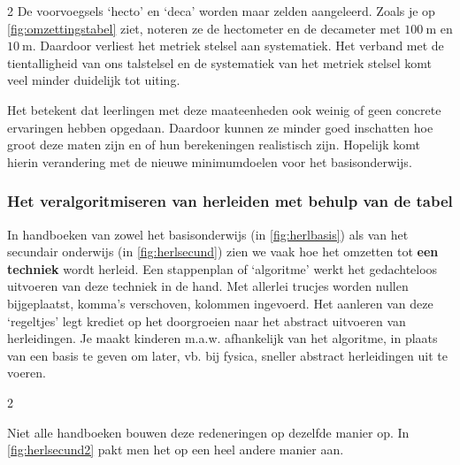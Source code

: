 \begin{multicols}{2}
De voorvoegsels `hecto' en `deca' worden maar zelden aangeleerd.
Zoals je op \autoref{fig:omzettingstabel} ziet, noteren ze de hectometer en de decameter met \(\SI{100}{\metre}\) en \(\SI{10}{\metre}\).
Daardoor verliest het metriek stelsel aan systematiek.
Het verband met de tientalligheid van ons talstelsel en de systematiek van het metriek stelsel komt veel minder duidelijk tot uiting.

Het betekent dat leerlingen met deze maateenheden ook weinig of geen concrete ervaringen hebben opgedaan.
Daardoor kunnen ze minder goed inschatten hoe groot deze maten zijn en of hun berekeningen realistisch zijn.
Hopelijk komt hierin verandering met de nieuwe minimumdoelen voor het basisonderwijs.

\subsubsection*{Het veralgoritmiseren van herleiden met behulp van de tabel}\label{het-veralgoritmiseren-van-herleiden-met-behulp-van-de-tabel}

In handboeken van zowel het basisonderwijs (in \autoref{fig:herlbasis}) als van het secundair onderwijs (in \autoref{fig:herlsecund}) zien we vaak hoe het omzetten tot \textbf{een techniek} wordt herleid.
Een stappenplan of `algoritme' werkt het gedachteloos uitvoeren van deze techniek in de hand.
Met allerlei trucjes worden nullen bijgeplaatst, komma's verschoven, kolommen ingevoerd.
Het aanleren van deze `regeltjes' legt krediet op het doorgroeien naar het abstract uitvoeren van herleidingen.
Je maakt kinderen m.a.w. afhankelijk van het algoritme, in plaats van een basis te geven om later, vb. bij fysica, sneller abstract herleidingen uit te voeren.
\end{multicols}



\begin{multicols}{2}

Niet alle handboeken bouwen deze redeneringen op dezelfde manier op.
In \autoref{fig:herlsecund2} pakt men het op een heel andere manier aan.

\end{multicols}

